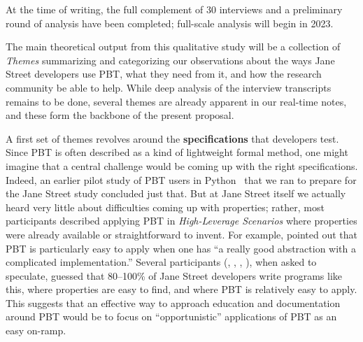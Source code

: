 
At the time of writing, the full
complement of 30 interviews and a preliminary round of analysis have
been completed; full-scale analysis will begin in 2023.

 The main theoretical output from
this qualitative study will be a collection of {\em Themes} summarizing
and categorizing our observations about the ways Jane Street developers
use PBT, what they need from it, and how the research community be
able to help.  While deep analysis of the interview transcripts remains
to be done, several themes are already apparent in our real-time
notes, and these form the backbone of the present proposal.

\newcommand{\proptheme}[1]{{\color{nord-orange} \em #1}}
\newcommand{\gentheme}[1]{{\color{nord-green} \em #1}}
\newcommand{\evaltheme}[1]{{\color{nord-purple} \em #1}}
A first set of
themes revolves around the {\bf specifications} that developers test.
Since
PBT is often described as a kind of lightweight formal method, one
might imagine that a central challenge would be coming up with the
right specifications. Indeed, an earlier pilot study of PBT users in
Python~\cite{goldstein_problems_2022} that we ran to prepare for the Jane Street
study\iflater{}\fi{}
concluded just that.
  But at Jane Street itself
we actually heard very little about difficulties coming up with
properties; rather, most participants described applying PBT in
\proptheme{High-Leverage Scenarios} where properties were already
available or straightforward to invent. For example,  pointed out
that PBT is particularly easy to apply when one has ``a really good abstraction
with a complicated implementation.''
Several participants (, ,
, ), when asked to speculate, guessed
that 80--100\% of Jane Street
developers write programs like this, where properties are easy to find, and
where PBT is relatively easy to apply.  This suggests that an effective way to
approach education and documentation around PBT would be to focus on
``opportunistic'' applications of PBT as an easy on-ramp.

